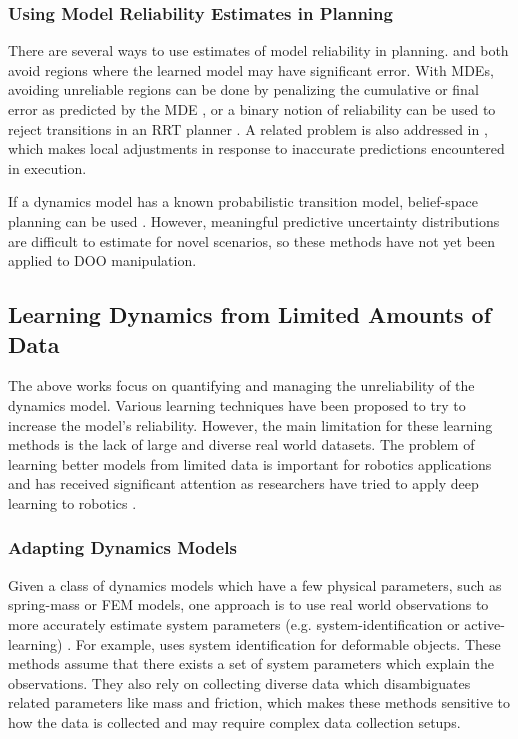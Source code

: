 \subsubsection{Using Model Reliability Estimates in Planning}

There are several ways to use estimates of model reliability in planning. \cite{Wang2019} and \cite{Ichter2019} both avoid regions where the learned model may have significant error. With MDEs, avoiding unreliable regions can be done by penalizing the cumulative or final error as predicted by the MDE \cite{MDEs22}, or a binary notion of reliability can be used to reject transitions in an RRT planner \cite{UnreliableDale2019}. A related problem is also addressed in \cite{Vemula2020}, which makes local adjustments in response to inaccurate predictions encountered in execution.

If a dynamics model has a known probabilistic transition model, belief-space planning can be used \cite{kaelbling2013integrated, platt2010belief}. However, meaningful predictive uncertainty distributions are difficult to estimate for novel scenarios, so these methods have not yet been applied to DOO manipulation.

\subsection{Learning Dynamics from Limited Amounts of Data}

The above works focus on quantifying and managing the unreliability of the dynamics model. Various learning techniques have been proposed to try to increase the model's reliability. However, the main limitation for these learning methods is the lack of large and diverse real world datasets. The problem of learning better models from limited data is important for robotics applications and has received significant attention as researchers have tried to apply deep learning to robotics \cite{DisbandOpenAI2021,ReviewKroemer2021}.

\subsubsection{Adapting Dynamics Models}

Given a class of dynamics models which have a few physical parameters, such as spring-mass or FEM models, one approach is to use real world observations to more accurately estimate system parameters (e.g. system-identification or active-learning) \cite{sastry1989adaptive, arndt2021few, evans2022context, nagabandi19learning}. For example, \cite{gradSim} uses system identification for deformable objects. These methods assume that there exists a set of system parameters which explain the observations. They also rely on collecting diverse data which disambiguates related parameters like mass and friction, which makes these methods sensitive to how the data is collected and may require complex data collection setups.

